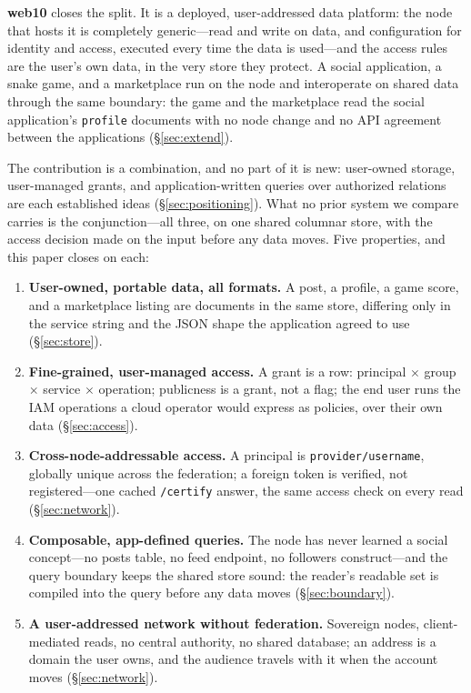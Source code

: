 \documentclass[sigconf, nonacm]{acmart}
\begin{document}
\textbf{web10} closes the split. It is a deployed, user-addressed data
platform: the node that hosts it is completely generic---read and write
on data, and configuration for identity and access, executed every time
the data is used---and the access rules are the user's own data, in the
very store they protect. A social application, a snake game, and a
marketplace run on the node and interoperate on shared data through the
same boundary: the game and the marketplace read the social
application's \texttt{profile} documents with no node change and no API
agreement between the applications (\S\ref{sec:extend}).

The contribution is a combination, and no part of it is new:
user-owned storage, user-managed grants, and application-written queries
over authorized relations are each established ideas
(\S\ref{sec:positioning}). What no prior system we compare carries is
the conjunction---all three, on one shared columnar store, with the
access decision made on the input before any data moves. Five
properties, and this paper closes on each:

\begin{enumerate}[leftmargin=*,nosep]
  \item \textbf{User-owned, portable data, all formats.} A post, a
  profile, a game score, and a marketplace listing are documents in the
  same store, differing only in the service string and the JSON shape
  the application agreed to use (\S\ref{sec:store}).
  \item \textbf{Fine-grained, user-managed access.} A grant is a row:
  principal $\times$ group $\times$ service $\times$ operation;
  publicness is a grant, not a flag; the end user runs the IAM
  operations a cloud operator would express as policies, over their own
  data (\S\ref{sec:access}).
  \item \textbf{Cross-node-addressable access.} A principal is
  \texttt{provider/\allowbreak username}, globally unique across the
  federation; a foreign token is verified, not registered---one cached
  \texttt{/certify} answer, the same access check on every read
  (\S\ref{sec:network}).
  \item \textbf{Composable, app-defined queries.} The node has never
  learned a social concept---no posts table, no feed endpoint, no
  followers construct---and the query boundary keeps the shared store
  sound: the reader's readable set is compiled into the query before any
  data moves (\S\ref{sec:boundary}).
  \item \textbf{A user-addressed network without federation.}
  Sovereign nodes, client-mediated reads, no central authority, no
  shared database; an address is a domain the user owns, and the
  audience travels with it when the account moves (\S\ref{sec:network}).
\end{enumerate}
\end{document}
